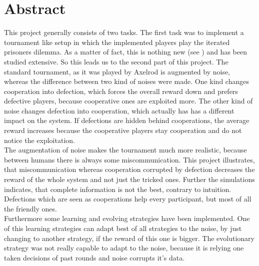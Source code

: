 \section{Abstract}

This project generally consists of two tasks. The first task was to implement a tournament like setup in which the implemented players play the iterated prisoners dilemma. As a matter of fact, this is nothing new (see \cite{axelrod}) and has been studied extensive. So this leads us to the second part of this project. The standard tournament, as it was played by Axelrod is augmented by noise, whereas the difference between two kind of noises were made. One kind changes cooperation into defection, which forces the overall reward down and prefers defective players, because cooperative ones are exploited more. The other kind of noise changes defection into cooperation, which actually has has a different impact on the system. If defections are hidden behind cooperations, the average reward increases because the cooperative players stay cooperation and do not notice the exploitation.\\

The augmentation of noise makes the tournament much more realistic, because between humans there is always some miscommunication. This project illustrates, that miscommunication whereas cooperation corrupted by defection decreases the reward of the whole system and not just the tricked ones. Further the simulations indicates, that complete information is not the best, contrary to intuition. Defections which are seen as cooperations help every participant, but most of all the friendly ones.\\

Furthermore some learning and evolving strategies have been implemented. One of this learning strategies can adapt best of all strategies to the noise, by just changing to another strategy, if the reward of this one is bigger. The evolutionary strategy was not really capable to adapt to the noise, because it is relying one taken decisions of past rounds and noise corrupts it's data.    
